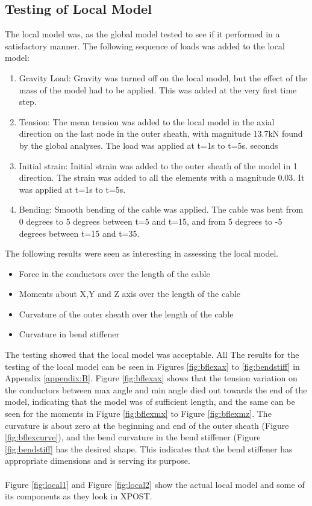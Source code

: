 \subsection{Testing of Local Model}
\label{sec:localtest}
The local model was, as the global model tested to see if it performed in a satisfactory manner.
 \noindent The following sequence of loads was added to the local model:
\begin{enumerate}
    \item Gravity Load: Gravity was turned off on the local model, but the effect of the mass of the model had to be applied. This was added at the very first time step.
    \item Tension: The mean tension was added to the local model in the axial direction on the last node in the outer sheath, with magnitude 13.7kN found by the global analyses. The load was applied at t=1s to t=5s. seconds
    \item Initial strain: Initial strain was added to the outer sheath of the model in 1 direction. The strain was added to all the elements with a magnitude 0.03. It was applied at t=1s to t=5s.
    \item Bending: Smooth bending of the cable was applied. The cable was bent from 0 degrees to 5 degrees between t=5 and t=15, and from 5 degrees to -5 degrees between t=15 and t=35.  
\end{enumerate}
The following results were seen as interesting in assessing the local model. 
\begin{itemize}
    \item Force in the conductors over the length of the cable
    \item Moments about X,Y and Z axis over the length of the cable
    \item Curvature of the outer sheath over the length of the cable
    \item Curvature in bend stiffener
\end{itemize}
The testing showed that the local model was acceptable. All  The results for the testing of the local model can be seen in Figures \ref{fig:bflexax} to \ref{fig:bendstiff} in Appendix \ref{appendix:B}. Figure \ref{fig:bflexax} shows that the tension variation on the conductors between max angle and min angle died out towards the end of the model, indicating that the model was of sufficient length, and the same can be seen for the moments in Figure \ref{fig:bflexmx} to Figure \ref{fig:bflexmz}. The curvature is about zero at the beginning and end of the outer sheath (Figure \ref{fig:bflexcurve}), and the bend curvature in the bend stiffener (Figure \ref{fig:bendstiff} has the desired shape. This indicates that the bend stiffener has appropriate dimensions and is serving its purpose. \\\\
Figure \ref{fig:local1} and Figure \ref{fig:local2} show the actual local model and some of its components as they look in XPOST.

